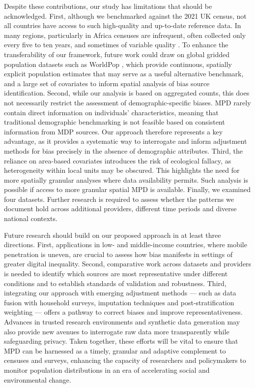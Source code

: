 \documentclass[]{rsos}%
\begin{document}
Despite these contributions, our study has limitations that should be
acknowledged. First, although we benchmarked against the 2021 UK census,
not all countries have access to such high-quality and up-to-date
reference data. In many regions, particularly in Africa censuses are
infrequent, often collected only every five to ten years, and sometimes
of variable quality \citep{dindi2025}. To enhance the transferability of our
framework, future work could draw on global gridded population datasets
such as WorldPop \citep{tatem2017}, which provide continuous, spatially
explicit population estimates that may serve as a useful alternative
benchmark, and a large set of covariates to inform spatial analysis of
bias source identification. Second, while our analysis is based on
aggregated counts, this does not necessarily restrict the assessment of
demographic-specific biases. MPD rarely contain direct information on
individuals' characteristics, meaning that traditional demographic
benchmarking is not feasible based on consistent information from MDP sources. Our approach therefore represents a key advantage, as
it provides a systematic way to interrogate and inform adjustment
methods for bias precisely in the absence of demographic attributes.
Third, the reliance on area-based covariates introduces the risk of
ecological fallacy, as heterogeneity within local units may be obscured.
This highlights the need for more spatially granular analyses where data
availability permits. Such analysis is possible if access to more
granular spatial MPD is available. Finally, we examined four datasets.
Further research is required to assess whether the patterns we document
hold across additional providers, different time periods and diverse
national contexts.

Future research should build on our proposed approach in at least three
directions. First, applications in low- and middle-income countries,
where mobile penetration is uneven, are crucial to assess how bias
manifests in settings of greater digital inequality. Second, comparative
work across datasets and providers is needed to identify which sources
are most representative under different conditions and to establish
standards of validation and robustness. Third, integrating our approach
with emerging adjustment methods --- such as data fusion with household
surveys, imputation techniques and post-stratification weighting ---
offers a pathway to correct biases and improve representativeness.
Advances in trusted research environments and synthetic data generation
may also provide new avenues to interrogate raw data more transparently
while safeguarding privacy. Taken together, these efforts will be vital
to ensure that MPD can be harnessed as a timely, granular and adaptive
complement to censuses and surveys, enhancing the capacity of
researchers and policymakers to monitor population distributions in an
era of accelerating social and environmental change.
\end{document}
